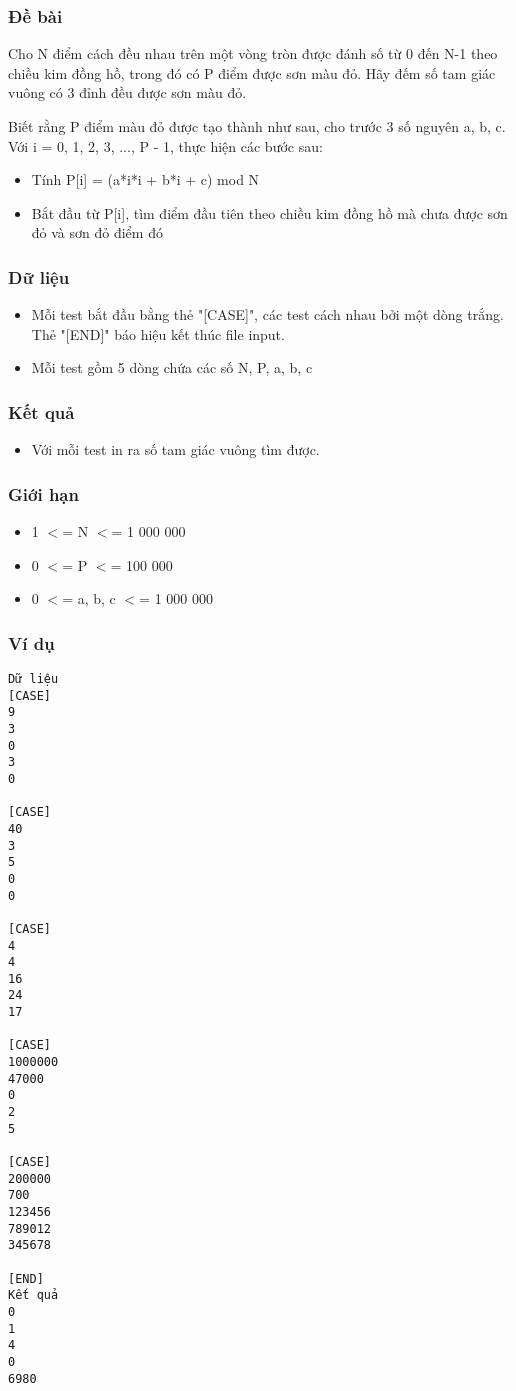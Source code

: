 



\subsubsection{   Đề bài  }

   Cho N điểm cách đều nhau trên một vòng tròn được đánh số từ 0 đến N-1 theo chiều kim đồng hồ, trong đó có P điểm được sơn màu đỏ. Hãy đếm số tam giác vuông có 3 đỉnh đều được sơn màu đỏ.  

   Biết rằng P điểm màu đỏ được tạo thành như sau, cho trước 3 số nguyên a, b, c. Với i = 0, 1, 2, 3, ..., P - 1, thực hiện các bước sau:  
\begin{itemize}
	\item     Tính P[i] = (a*i*i + b*i + c) mod N   
	\item     Bắt đầu từ P[i], tìm điểm đầu tiên theo chiều kim đồng hồ mà chưa được sơn đỏ và sơn đỏ điểm đó   
\end{itemize}

\subsubsection{   Dữ liệu  }
\begin{itemize}
	\item     Mỗi test bắt đầu bằng thẻ "[CASE]", các test cách nhau bởi một dòng trắng. Thẻ "[END]" báo hiệu kết thúc file input.   
	\item     Mỗi test gồm 5 dòng chứa các số N, P, a, b, c   
\end{itemize}

\subsubsection{   Kết quả  }
\begin{itemize}
	\item     Với mỗi test in ra số tam giác vuông tìm được.   
\end{itemize}

\subsubsection{   Giới hạn  }
\begin{itemize}
	\item     1 $<$= N $<$= 1 000 000   
	\item     0 $<$= P $<$= 100 000   
	\item     0 $<$= a, b, c $<$= 1 000 000   
\end{itemize}

\subsubsection{   Ví dụ  }
\begin{verbatim}
Dữ liệu
[CASE]
9
3
0
3
0

[CASE]
40
3
5
0
0

[CASE]
4
4
16
24
17
    	
[CASE]
1000000
47000
0
2
5

[CASE]
200000
700
123456
789012
345678

[END]
Kết quả
0
1
4
0
6980
\end{verbatim}